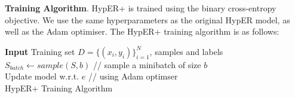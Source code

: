 \textbf{Training Algorithm}. HypER+ is trained using the binary cross-entropy objective. We use the same hyperparameters as the original HypER model, as well as the Adam optimiser. The HypER+ training algorithm is as follows: \newline

\begin{algorithm}[H]
	\SetAlgoLined
	\textbf{Input} 
	Training set \begin{math} D = \{(x_i, y_i)\}_{i=1}^N \end{math}, samples and labels\;
  	\begin{math} S_{batch} \gets sample(S, b) \end{math} // sample a minibatch of size \begin{math} b \end{math} \\
	Update model w.r.t. \begin{math}  e \end{math} // using Adam optimser \\
	\caption{HypER+ Training Algorithm}
\end{algorithm} \bigbreak
